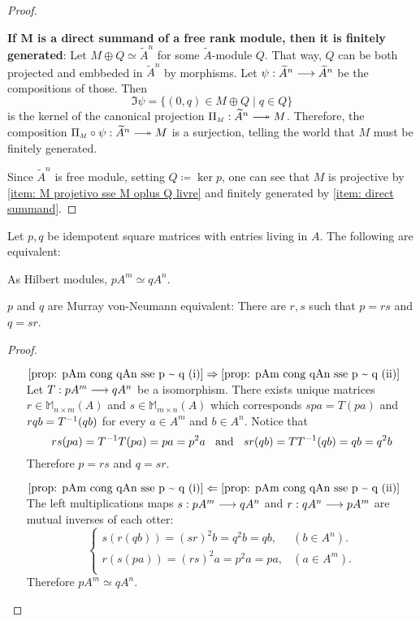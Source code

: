 \begin{proposicao}
\begin{proof}
\begin{itroman}
    \item \label{item: direct summand}\textbf{If $\boldsymbol M$ is a direct summand of a free rank module, then it is finitely generated}: Let $M\oplus Q \simeq {\widetilde{A}}^n$ for some $\widetilde A$-module $Q$. That way, $Q$ can be both projected and embbeded in ${\widetilde{A}}^n$ by morphisms. Let $\psi : {\widetilde{A}}^n \longrightarrow {\widetilde{A}}^n$ be the compositions of those. Then
    \[\Im \psi = \{(0,q) \in M \oplus Q \mid q \in Q\}\]
    is the kernel of the canonical projection $\sub \Pi M : {\widetilde{A}}^n \longtwoheadrightarrow M$. Therefore, the composition $\sub \Pi M \circ \psi : {\widetilde{A}}^n \longtwoheadrightarrow M$ is a surjection, telling the world that $M$ must be finitely generated.
\end{itroman}
Since ${\widetilde{A}}^n$ is free module, setting $Q \coloneqq \ker p$, one can see that $M$ is projective by \ref{item: M projetivo sse M oplus Q livre} and finitely generated by \ref{item: direct summand}. 
\end{proof}
\end{proposicao}

\begin{lema}\label{prop: pAm cong qAn sse p ~ q}
Let $p, q$ be idempotent square matrices with entries living in $A$. The following are equivalent:
\begin{itroman}
    \item\label{prop: pAm cong qAn sse p ~ q (i)} As Hilbert modules, $pA^m \simeq q A^n$.
    \item\label{prop: pAm cong qAn sse p ~ q (ii)} $p$ and $q$ are Murray von-Neumann equivalent: There are $r,s$ such that $p=rs$ and $q=sr$.
\end{itroman}
\begin{proof}
$\left.\right.$
\begin{itemize}
    \item[$\ref{prop: pAm cong qAn sse p ~ q (i)} \Rightarrow \ref{prop: pAm cong qAn sse p ~ q (ii)}$] Let $T: pA^m \longrightarrow qA^n$ be a isomorphism. There exists unique matrices $r \in \mathbb M_{n \times m}(A)$ and $s\in \mathbb M_{m \times n}(A)$ which corresponds $spa = T(pa)$ and $rqb = {T}^{-1}(qb)$ for every $a\in A^m$ and $b\in A^n$. Notice that
    \[
    rs(pa) = {T}^{-1}T(pa) = pa = p^2a \hspace{0.25cm}\operatorname{and}\hspace{0.25cm}
    sr(qb) = T{T}^{-1}(qb) = qb = q^2b 
    \]
    Therefore $p = rs$ and $q = sr$.
    \item[$\ref{prop: pAm cong qAn sse p ~ q (i)} \Leftarrow \ref{prop: pAm cong qAn sse p ~ q (ii)}$] The left multiplications maps $s:pA^m \longrightarrow qA^n$ and $r: qA^n \longrightarrow pA^m$ are mutual inverses of each otter:
    \[
    \begin{cases}
    s(r(qb)) = (sr)^2b = q^2b = qb, & (b \in A^n).\\
    r(s(pa)) = (rs)^2a = p^2a = pa, & (a \in A^m).\\
    \end{cases}
    \]
    Therefore $ pA^m \simeq qA^n $. \qedhere
\end{itemize}
\end{proof}
\end{lema}


